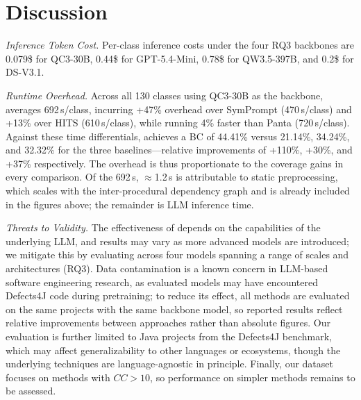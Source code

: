 \section{Discussion}


{\em Inference Token Cost.}
Per-class inference costs under the four RQ3 backbones are 0.079\$ for QC3-30B, 0.44\$ for GPT-5.4-Mini, 0.78\$ for QW3.5-397B, and 0.2\$ for DS-V3.1.

{\em Runtime Overhead.}
Across all 130 classes using QC3-30B as the backbone, \ourmethod{} averages 692\,s/class, incurring +47\% overhead over SymPrompt (470\,s/class) and +13\% over HITS (610\,s/class), while running 4\% faster than Panta (720\,s/class). 
Against these time differentials, \ourmethod{} achieves a BC of 44.41\% versus 21.14\%, 34.24\%, and 32.32\% for the three baselines---relative improvements of +110\%, +30\%, and +37\% respectively. The overhead is thus proportionate to the coverage gains in every comparison.
Of the 692\,s, $\approx$1.2\,s is attributable to static preprocessing, which scales with the inter-procedural dependency graph and is already included in the figures above; the remainder is LLM inference time. 

{\em Threats to Validity.}
The effectiveness of \ourmethod{} depends on the capabilities of the underlying LLM, and results may vary as more advanced models are introduced; we mitigate this by evaluating across four models spanning a range of scales and architectures (RQ3). 
Data contamination is a known concern in LLM-based software engineering research, as evaluated models may have encountered Defects4J code during pretraining; to reduce its effect, all methods are evaluated on the same projects with the same backbone model, so reported results reflect relative improvements between approaches rather than absolute figures. 
Our evaluation is further limited to Java projects from the Defects4J benchmark, which may affect generalizability to other languages or ecosystems, though the underlying techniques are language-agnostic in principle. 
Finally, our dataset focuses on methods with $CC > 10$, so performance on simpler methods remains to be assessed.
